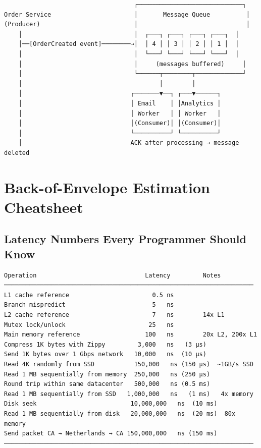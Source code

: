 \documentclass[11pt]{article}
\begin{document}
\setcodelang{}

\begin{verbatim}
                                    ┌─────────────────────────────┐
Order Service                       │       Message Queue          │
(Producer)                          │                              │
    │                               │  ┌───┐ ┌───┐ ┌───┐ ┌───┐  │
    │──[OrderCreated event]────────→│  │ 4 │ │ 3 │ │ 2 │ │ 1 │  │
    │                               │  └───┘ └───┘ └───┘ └───┘  │
    │                               │     (messages buffered)     │
    │                               └──────┬────────┬─────────────┘
    │                                      │        │
    │                              ┌───────▼──┐ ┌───▼──────┐
    │                              │ Email    │ │Analytics │
    │                              │ Worker   │ │ Worker   │
    │                              │(Consumer)│ │(Consumer)│
    │                              └──────────┘ └──────────┘
    │                              ACK after processing → message deleted
\end{verbatim}

\section{Back-of-Envelope Estimation Cheatsheet}\label{back-of-envelope-estimation-cheatsheet}

\subsection{Latency Numbers Every Programmer Should Know}\label{latency-numbers-every-programmer-should-know}

\setcodelang{}

\begin{verbatim}
Operation                              Latency         Notes
─────────────────────────────────────────────────────────────────────
L1 cache reference                       0.5 ns
Branch mispredict                        5   ns
L2 cache reference                       7   ns        14x L1
Mutex lock/unlock                       25   ns
Main memory reference                  100   ns        20x L2, 200x L1
Compress 1K bytes with Zippy         3,000   ns   (3 μs)
Send 1K bytes over 1 Gbps network   10,000   ns  (10 μs)
Read 4K randomly from SSD           150,000   ns (150 μs)  ~1GB/s SSD
Read 1 MB sequentially from memory  250,000   ns (250 μs)
Round trip within same datacenter   500,000   ns (0.5 ms)
Read 1 MB sequentially from SSD   1,000,000   ns   (1 ms)   4x memory
Disk seek                          10,000,000   ns  (10 ms)
Read 1 MB sequentially from disk   20,000,000   ns  (20 ms)  80x memory
Send packet CA → Netherlands → CA 150,000,000   ns (150 ms)
─────────────────────────────────────────────────────────────────────
\end{verbatim}
\end{document}
